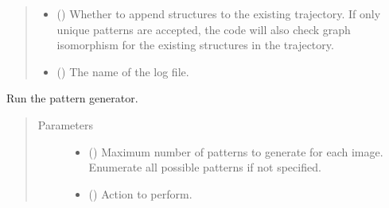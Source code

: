 \documentclass[letterpaper,10pt,english]{sphinxmanual}
\begin{document}
\begin{fulllineitems}
\begin{quote}
\begin{description}
\begin{itemize}
\item {} 
 (\sphinxstyleliteralemphasis{\sphinxupquote{, }}) \textendash{} Whether to append structures to the existing trajectory.
If only unique patterns are accepted, the code will also check
graph isomorphism for the existing structures in the trajectory.

\item {} 
 (\sphinxstyleliteralemphasis{\sphinxupquote{, }}) \textendash{} The name of the log file.

\end{itemize}

\end{description}\end{quote}

\begin{fulllineitems}
\label{\detokenize{build:acat.build.patterns.SystematicPatternGenerator.run}}
Run the pattern generator.
\begin{quote}\begin{description}
\item[{Parameters}] \leavevmode\begin{itemize}
\item {} 
 (\sphinxstyleliteralemphasis{\sphinxupquote{, }}) \textendash{} Maximum number of patterns to generate for each image. Enumerate
all possible patterns if not specified.

\item {} 
 (\sphinxstyleliteralemphasis{\sphinxupquote{, }}) \textendash{} Action to perform.


\end{itemize}
\end{description}
\end{quote}
\end{fulllineitems}
\end{fulllineitems}
\end{document}
